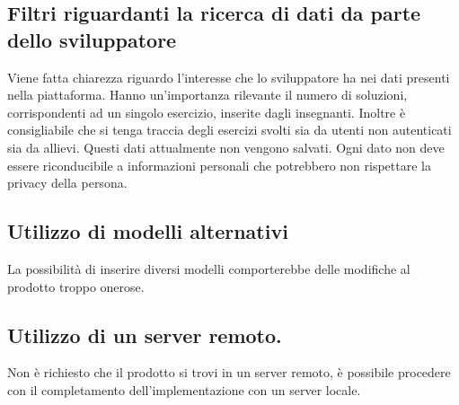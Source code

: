 \documentclass[11pt,a4paper]{article}
\begin{document}
	\subsection{Filtri riguardanti la ricerca di dati da parte dello sviluppatore}
	Viene fatta chiarezza riguardo l'interesse che lo sviluppatore ha nei dati presenti nella piattaforma. Hanno un'importanza rilevante il numero di soluzioni, corrispondenti ad un singolo esercizio, inserite dagli insegnanti. Inoltre è consigliabile che si tenga traccia degli esercizi svolti sia da utenti non autenticati sia da allievi. Questi dati attualmente non vengono salvati. Ogni dato non deve essere riconducibile a informazioni personali che potrebbero non rispettare la privacy della persona.
	
	\subsection{Utilizzo di modelli alternativi}
	La possibilità di inserire diversi modelli comporterebbe delle modifiche al prodotto troppo onerose. 
	
	\subsection{Utilizzo di un server remoto.}
	Non è richiesto che il prodotto si trovi in un server remoto, è possibile procedere con il completamento dell'implementazione con un server locale.
	
\end{document}

